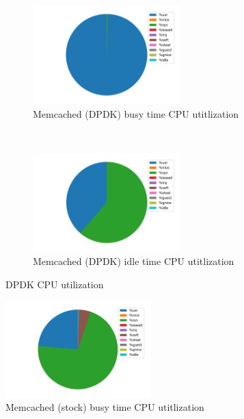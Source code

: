 \documentclass[bsc,frontabs,twoside,singlespacing,parskip,deptreport]{infthesis}     %
\begin{document}
\begin{figure}[t!]
    \centering
    \begin{subfigure}[t]{0.5\textwidth}
    	\includegraphics[height=1.5in]{figure/dpdk_busy_pie.pdf}
    	\caption{Memcached (DPDK) busy time CPU utitlization }
		\label{fig:dpdk_busy_pie}
		
    \end{subfigure}%
    ~ 
    \begin{subfigure}[t]{0.5\textwidth}
        \includegraphics[height=1.5in]{figure/dpdk_idle_pie.pdf}
        \caption{Memcached (DPDK) idle time CPU utitlization}
		\label{fig:dpdk_idle_pie}
        
		
    \end{subfigure}
    \caption{DPDK CPU utilization}
\end{figure}







\begin{figure}[h]

	\includegraphics[width=0.5\textwidth]{figure/mem_busy_pie.pdf}
	\caption{Memcached (stock) busy time CPU utitlization}
	\label{fig:dpdk_idle_pie_1}
\end{figure}
\end{document}
